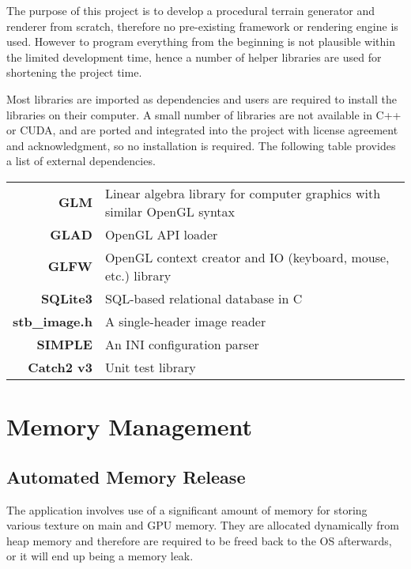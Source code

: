 \documentclass[oneside, a4paper]{report}
\begin{document}
    The purpose of this project is to develop a procedural terrain generator and renderer from scratch, therefore no pre-existing framework or rendering engine is used. However to program everything from the beginning is not plausible within the limited development time, hence a number of helper libraries are used for shortening the project time.

    Most libraries are imported as dependencies and users are required to install the libraries on their computer. A small number of libraries are not available in C++ or CUDA, and are ported and integrated into the project with license agreement and acknowledgment, so no installation is required. The following table provides a list of external dependencies.

    \begin{center}
        \begin{tabular}{r|p{11cm}}
            \textbf{GLM} & Linear algebra library for computer graphics with similar OpenGL syntax \\
            \textbf{GLAD} & OpenGL API loader \\
            \textbf{GLFW} & OpenGL context creator and IO (keyboard, mouse, etc.) library \\
            \textbf{SQLite3} & SQL-based relational database in C \\
            \textbf{stb\_image.h} & A single-header image reader \\
            \textbf{SIMPLE} & An INI configuration parser \\
            \textbf{Catch2 v3} & Unit test library
        \end{tabular}
    \end{center}

    \section{Memory Management}

    \subsection{Automated Memory Release}

    The application involves use of a significant amount of memory for storing various texture on main and GPU memory. They are allocated dynamically from heap memory and therefore are required to be freed back to the OS afterwards, or it will end up being a memory leak.
\end{document}
